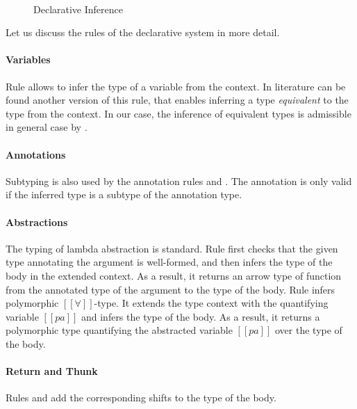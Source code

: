 \begin{figure}[h]

  \begin{multicols}{2}
  \ottdefnDTNInf{}
  \columnbreak\\
  \ottdefnDTPInf{}
  \ottdefnDTSpinInf{}
  \end{multicols}
  \hfill

  \caption{Declarative Inference}
  \label{fig:declarative-inference}
\end{figure}

Let us discuss the rules of the declarative system in more detail.

\paragraph{Variables}
  Rule  allows to infer
  the type of a variable from the context. 
  In literature can be found another version of this rule,
  that enables inferring a type \emph{equivalent}
  to the type from the context. 
  In our case, the inference of equivalent types
  is admissible in general case by .

\paragraph{Annotations}
  Subtyping is also used by the annotation rules 
  and . The annotation is only valid if the
  inferred type is a subtype of the annotation type.


\paragraph{Abstractions}
  The typing of lambda abstraction is standard. 
  Rule  first checks
  that the given type annotating the argument is well-formed,
  and then infers the type of the body in the extended context.
  As a result, it returns an arrow type of function from the
  annotated type of the argument to the type of the body.
  Rule  infers polymorphic $[[∀]]$-type. 
  It extends the type context with the quantifying variable $[[pa]]$ and 
  infers the type of the body. As a result, it returns a polymorphic type
  quantifying the abstracted variable $[[pa]]$ over the type of the body.

\paragraph{Return and Thunk}
  Rules  
  and 
  add the corresponding shifts to the type of the body.

